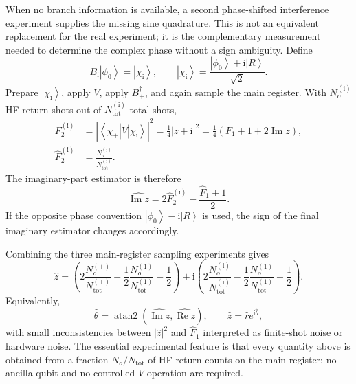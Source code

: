 \documentclass[11pt]{article}
\newcommand{\ii}{\mathrm{i}}
\newcommand{\ket}[1]{\left|#1\right\rangle}
\newcommand{\bra}[1]{\left\langle#1\right|}
\begin{document}
When no branch information is available, a second phase-shifted interference experiment supplies the missing sine quadrature.  This is not an equivalent replacement for the real experiment; it is the complementary measurement needed to determine the complex phase without a sign ambiguity.  Define
\begin{equation}
    B_{\ii}\ket{\phi_0}=\ket{\chi_{\ii}},
    \qquad
    \ket{\chi_{\ii}}=\frac{\ket{\phi_0}+\ii\ket{R}}{\sqrt{2}}.
\end{equation}
Prepare $\ket{\chi_{\ii}}$, apply $V$, apply $B_+^\dagger$, and again sample the main register.  With $N_o^{(\ii)}$ HF-return shots out of $N_{\mathrm{tot}}^{(\ii)}$ total shots,
\begin{align}
    F_2^{(\ii)}
    &= \left|\bra{\chi_+}V\ket{\chi_{\ii}}\right|^2
     = \frac{1}{4}|z+\ii|^2
     = \frac{1}{4}\left(F_1+1+2\operatorname{Im}z\right), \\
    \widehat{F}_2^{(\ii)}
    &= \frac{N_o^{(\ii)}}{N_{\mathrm{tot}}^{(\ii)}}.
    \label{eq:mfe_f2_i_counts}
\end{align}
The imaginary-part estimator is therefore
\begin{equation}
    \widehat{\operatorname{Im}z}
    = 2\widehat{F}_2^{(\ii)}-\frac{\widehat{F}_1+1}{2}.
    \label{eq:mfe_imag_counts}
\end{equation}
If the opposite phase convention $\ket{\phi_0}-\ii\ket{R}$ is used, the sign of the final imaginary estimator changes accordingly.

Combining the three main-register sampling experiments gives
\begin{equation}
    \widehat{z}
    = \left(2\frac{N_o^{(+)}}{N_{\mathrm{tot}}^{(+)}}-\frac{1}{2}\frac{N_o^{(1)}}{N_{\mathrm{tot}}^{(1)}}-\frac{1}{2}\right)
    + \ii\left(2\frac{N_o^{(\ii)}}{N_{\mathrm{tot}}^{(\ii)}}-\frac{1}{2}\frac{N_o^{(1)}}{N_{\mathrm{tot}}^{(1)}}-\frac{1}{2}\right).
    \label{eq:mfe_z_counts}
\end{equation}
Equivalently,
\begin{equation}
    \widehat{\theta}=\operatorname{atan2}\left(\widehat{\operatorname{Im}z},\widehat{\operatorname{Re}z}\right),
    \qquad
    \widehat{z}=\widehat{r}e^{\ii\widehat{\theta}},
\end{equation}
with small inconsistencies between $|\widehat{z}|^2$ and $\widehat{F}_1$ interpreted as finite-shot noise or hardware noise.  The essential experimental feature is that every quantity above is obtained from a fraction $N_o/N_{\mathrm{tot}}$ of HF-return counts on the main register; no ancilla qubit and no controlled-$V$ operation are required.
\end{document}

